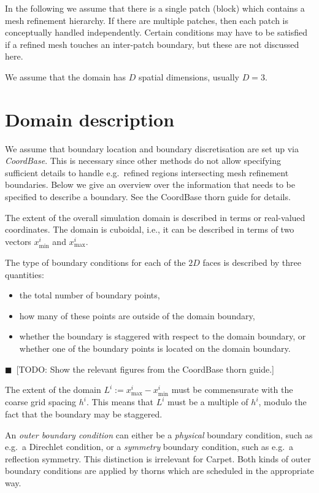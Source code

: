 \documentclass[oneside]{amsart}
\newcommand{\todo}[1]{{\color{blue}$\blacksquare$~\textsf{[TODO: #1]}}}
\begin{document}
In the following we assume that there is a single patch (block) which
contains a mesh refinement hierarchy.  If there are multiple patches,
then each patch is conceptually handled independently.  Certain
conditions may have to be satisfied if a refined mesh touches an
inter-patch boundary, but these are not discussed here.

We assume that the domain has $D$ spatial dimensions, usually $D=3$.



\section{Domain description}

We assume that boundary location and boundary discretisation are set
up via \emph{CoordBase}.  This is necessary since other methods do not
allow specifying sufficient details to handle e.g.\ refined regions
intersecting mesh refinement boundaries.  Below we give an overview
over the information that needs to be specified to describe a
boundary.  See the CoordBase thorn guide for details.

The extent of the overall simulation domain is described in terms or
real-valued coordinates.  The domain is cuboidal, i.e., it can be
described in terms of two vectors $x^i_\mathrm{min}$ and
$x^i_\mathrm{max}$.

The type of boundary conditions for each of the $2D$ faces is
described by three quantities:
\begin{itemize}
\item the total number of boundary points,
\item how many of these points are outside of the domain boundary,
\item whether the boundary is staggered with respect to the domain
  boundary, or whether one of the boundary points is located on the
  domain boundary.
\end{itemize}
\todo{Show the relevant figures from the CoordBase thorn guide.}

The extent of the domain $L^i := x^i_\mathrm{max} - x^i_\mathrm{min}$
must be commensurate with the coarse grid spacing $h^i$.  This means
that $L^i$ must be a multiple of $h^i$, modulo the fact that the
boundary may be staggered.

An \emph{outer boundary condition} can either be a \emph{physical}
boundary condition, such as e.g.\ a Direchlet condition, or a
\emph{symmetry} boundary condition, such as e.g.\ a reflection
symmetry.  This distinction is irrelevant for Carpet.  Both kinds of
outer boundary conditions are applied by thorns which are scheduled in
the appropriate way.
\end{document}
